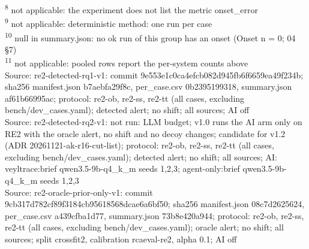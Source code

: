 \begin{table}[t]
\textsuperscript{8} not applicable: the experiment does not list the metric onset\_error\\
\textsuperscript{9} not applicable: deterministic method: one run per case\\
\textsuperscript{10} null in summary.json: no ok run of this group has an onset (Onset n = 0; 04 \S{}7)\\
\textsuperscript{11} not applicable: pooled rows report the per-system counts above\\
Source: re2-detected-rq1-v1: commit 9e553e1c0ca4efcb082d945fb6f6659ea49f234b; sha256 manifest.json b7aebfa29f8c, per\_case.csv 0b2395199318, summary.json af61b66995ac; protocol: re2-ob, re2-ss, re2-tt (all cases, excluding bench/dev\_cases.yaml); detected alert; no shift; all sources; AI off\\
Source: re2-detected-rq2-v1: not run: LLM budget; v1.0 runs the AI arm only on RE2 with the oracle alert, no shift and no decoy changes; candidate for v1.2 (ADR 20261121-ak-r16-cut-list); protocol: re2-ob, re2-ss, re2-tt (all cases, excluding bench/dev\_cases.yaml); detected alert; no shift; all sources; AI: veyltrace:brief qwen3.5-9b-q4\_k\_m seeds 1,2,3; agent-only:brief qwen3.5-9b-q4\_k\_m seeds 1,2,3\\
Source: re2-oracle-prior-only-v1: commit 9cb317d782cf89f3184cb95618568dcae6a6bf50; sha256 manifest.json 08c7d2625624, per\_case.csv a439cfba1d77, summary.json 73b8e420a944; protocol: re2-ob, re2-ss, re2-tt (all cases, excluding bench/dev\_cases.yaml); oracle alert; no shift; all sources; split crossfit2, calibration rcaeval-re2, alpha 0.1; AI off\\
\end{table}
